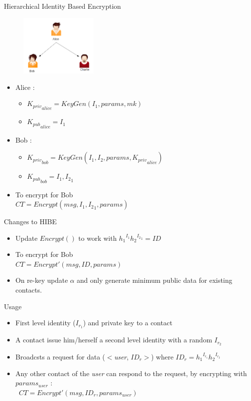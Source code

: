 \documentclass{beamer}
\begin{document}
\begin{frame}{Hierarchical Identity Based Encryption}
\begin{figure}
\includegraphics[height=3cm]{img/img3.png} 
\end{figure}

\begin{itemize}
\item Alice :
\begin{itemize}
\item ${K_{priv}}_{alice} = KeyGen(I_1, params, mk)$ 
\item ${K_{pub}}_{alice} = I_1$
\end{itemize}

\item Bob :
\begin{itemize}
\item ${K_{priv}}_{bob} = KeyGen(I_1, I_2, params, {K_{priv}}_{alice})$
\item ${K_{pub}}_{bob} = I_1, {I_2}_1$
\end{itemize}

\item To encrypt for Bob \\ $CT = Encrypt(msg, I_1, {I_2}_1, params)$


\end{itemize}
\end{frame}

\begin{frame}{Changes to HIBE}

\begin{itemize}
\item Update $Encrypt()$ to work with ${h_1}^{I_1}{h_2}^{{I_2}_1} = ID$
\item To encrypt for Bob \\ $CT = Encrypt'(msg, ID, params)$
\item On re-key update $\alpha$ and only generate minimum public data for existing contacts.
\end{itemize}
\end{frame}

\begin{frame}{Usage}
\begin{itemize}
\item First level identity ($I_{r_1}$) and private key to a contact
\item A contact issue him/herself a second level identity with a random $I_{r_2}$
\item Broadcsts a request for data ($<$\emph{user}, $ID_r>$) where $ID_r = {h_1}^{I_{r_1}}{h_2}^{I_{r_2}}$
\item Any other contact of the \emph{user} can respond to the request, by encrypting with $params_{user}$ : \\\
$CT = Encrypt'(msg, ID_r, params_{user})$
\end{itemize}
\end{frame}
\end{document}
